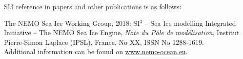 \documentclass[../../tex_main/NEMO_manual]{subfiles}
\begin{document}
\vspace{1cm}
SI3 reference in papers and other publications is as follows:
\vspace{0.5cm}

The NEMO Sea Ice Working Group, 2018: SI$^3$ -- Sea Ice modelling Integrated Initiative -- The NEMO Sea Ice Engine, \textit{Note du P\^ole de mod\'{e}lisation}, Institut Pierre-Simon Laplace (IPSL), France, 
No XX, ISSN No 1288-1619.\\

\vspace{0.5cm}
Additional information can be found on \href{http://www.nemo-ocean.eu/}{www.nemo-ocean.eu}.
\vspace{0.5cm}
\end{document}
